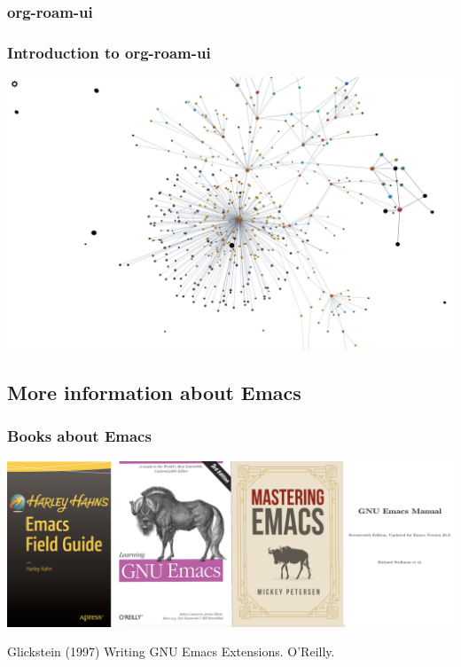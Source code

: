 \documentclass[aspectratio=169]{beamer}
\begin{document}

\subsubsection{org-roam-ui}
\begin{frame}
\frametitle{Introduction to org-roam-ui}
\begin{center}
    \includegraphics[scale=0.25]{Figures/myzk.png}
\end{center}
\end{frame}


\subsection{More information about Emacs}
\begin{frame}                                             
\frametitle{Books about Emacs}
\begin{center}
    \includegraphics[scale=0.35]{Figures/EmacsBooks.png}
\end{center}
Glickstein (1997) Writing  GNU Emacs Extensions. O'Reilly.
\end{frame}
\end{document}
